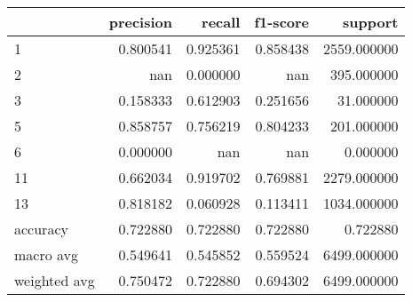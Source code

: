 \begin{tabular}{lrrrr}
\toprule
 & precision & recall & f1-score & support \\
\midrule
1 & 0.800541 & 0.925361 & 0.858438 & 2559.000000 \\
2 & nan & 0.000000 & nan & 395.000000 \\
3 & 0.158333 & 0.612903 & 0.251656 & 31.000000 \\
5 & 0.858757 & 0.756219 & 0.804233 & 201.000000 \\
6 & 0.000000 & nan & nan & 0.000000 \\
11 & 0.662034 & 0.919702 & 0.769881 & 2279.000000 \\
13 & 0.818182 & 0.060928 & 0.113411 & 1034.000000 \\
accuracy & 0.722880 & 0.722880 & 0.722880 & 0.722880 \\
macro avg & 0.549641 & 0.545852 & 0.559524 & 6499.000000 \\
weighted avg & 0.750472 & 0.722880 & 0.694302 & 6499.000000 \\
\bottomrule
\end{tabular}
